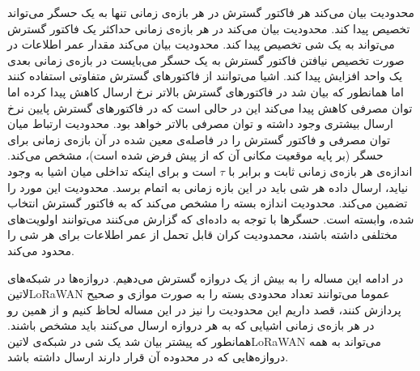 محدودیت  بیان می‌کند هر فاکتور گسترش در هر بازه‌ی زمانی تنها به یک حسگر می‌تواند تخصیص پیدا کند.
محدودیت  بیان می‌کند در هر بازه‌ی زمانی حداکثر یک فاکتور گسترش می‌تواند به یک شی تخصیص پیدا کند.
محدودیت  بیان می‌کند مقدار عمر اطلاعات در صورت تخصیص نیافتن فاکتور گسترش به یک حسگر می‌بایست در بازه‌ی زمانی بعدی یک واحد افزایش پیدا کند.
اشیا می‌توانند از فاکتورهای گسترش متفاوتی استفاده کنند اما همانطور که بیان شد در فاکتورهای گسترش بالاتر نرخ ارسال کاهش پیدا کرده اما توان مصرفی کاهش پیدا می‌کند این در حالی است که
در فاکتورهای گسترش پایین نرخ ارسال بیشتری وجود داشته و توان مصرفی بالاتر خواهد بود. محدودیت  ارتباط میان توان مصرفی و فاکتور گسترش را در فاصله‌ی
معین شده در آن بازه‌ی زمانی برای حسگر (بر پایه موقعیت مکانی آن که از پیش فرض شده است)، مشخص می‌کند.
اندازه‌ی هر بازه‌ی زمانی ثابت و برابر با $\tau$ است و برای اینکه تداخلی میان اشیا به وجود نیاید، ارسال داده هر شی باید در این بازه زمانی به اتمام برسد.
محدودیت  این مورد را تضمین می‌کند.
محدودیت  اندازه بسته را مشخص می‌کند که به فاکتور گسترش انتخاب شده، وابسته است.
حسگرها با توجه به داده‌ای که گزارش می‌کنند می‌توانند اولویت‌های مختلفی داشته باشند، محمدودیت  کران قابل تحمل از عمر اطلاعات برای هر شی را محدود می‌کند.


در ادامه این مساله را به بیش از یک دروازه گسترش می‌دهیم. دروازه‌ها در شبکه‌های ‌لاتین{LoRaWAN} عموما می‌توانند تعداد محدودی بسته را به صورت موازی و صحیح پردازش کنند، قصد داریم این محدودیت را
نیز در این مساله لحاظ کنیم و از همین رو در هر بازه‌ی زمانی اشیایی که به هر دروازه ارسال می‌کنند باید مشخص باشند. همانطور که پیشتر بیان شد یک شی در شبکه‌ی ‌لاتین{LoRaWAN} می‌تواند به همه دروازه‌هایی
که در محدوده آن قرار دارند ارسال داشته باشد.
